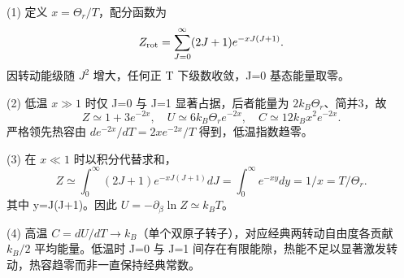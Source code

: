 (1) 定义 \(x=\Theta_r/T\)，配分函数为
\[
Z_{\rm rot}=\sum_{J=0}^\infty(2J+1)e^{-xJ(J+1)}.
\]
因转动能级随 \(J^{2}\) 增大，任何正 T 下级数收敛，J=0 基态能量取零。

(2) 低温 \(x\gg1\) 时仅 J=0 与 J=1 显著占据，后者能量为 \(2k_B\Theta_r\)、简并3，故
\[
Z\simeq1+3e^{-2x},\quad
U\simeq6k_B\Theta_r e^{-2x},
\quad
C\simeq12k_Bx^2e^{-2x}.
\]
严格领先热容由 \(d e^{-2x}/dT=2x e^{-2x}/T\) 得到，低温指数趋零。

(3) 在 \(x\ll1\) 时以积分代替求和，
\[
Z\simeq\int_0^\infty(2J+1)e^{-xJ(J+1)}dJ
=\int_0^\infty e^{-xy}dy=1/x=T/\Theta_r.
\]
其中 y=J(J+1)。因此 \(U=-\partial_\beta\ln Z\simeq k_BT\)。

(4) 高温 \(C=dU/dT\to k_B\)（单个双原子转子），对应经典两转动自由度各贡献 \(k_B/2\) 平均能量。低温时 J=0 与 J=1 间存在有限能隙，热能不足以显著激发转动，热容趋零而非一直保持经典常数。
